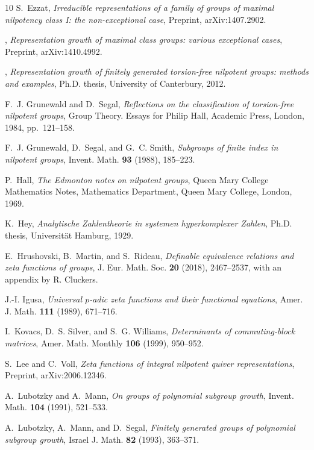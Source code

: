 \documentclass[11pt,a4paper]{amsart}
\theoremstyle{plain}
\theoremstyle{remark}
\begin{document}
\begin{thebibliography}{10}
S.~Ezzat, \emph{{Irreducible representations of a family of groups of maximal
  nilpotency class I: the non-exceptional case}}, Preprint, arXiv:1407.2902.

\bysame, \emph{{Representation growth of maximal class groups: various
  exceptional cases}}, Preprint, arXiv:1410.4992.

\bysame, \emph{{Representation growth of finitely generated torsion-free
  nilpotent groups: methods and examples}}, Ph.D. thesis, University of
  Canterbury, 2012.

F.~J. Grunewald and D.~Segal, \emph{Reflections on the classification of
  torsion-free nilpotent groups}, Group Theory. Essays for Philip Hall,
  Academic Press, London, 1984, pp.~121--158.

F.~J. Grunewald, D.~Segal, and G.~C. Smith, \emph{Subgroups of finite index in
  nilpotent groups}, Invent. Math. \textbf{93} (1988), 185--223.

P.~Hall, \emph{The {E}dmonton notes on nilpotent groups}, Queen Mary College
  Mathematics Notes, Mathematics Department, Queen Mary College, London, 1969.

K.~Hey, \emph{{Analytische Zahlentheorie in systemen hyperkomplexer Zahlen}},
  Ph.D. thesis, Universit\"{a}t Hamburg, 1929.

E.~Hrushovski, B.~Martin, and S.~Rideau, \emph{Definable equivalence relations
  and zeta functions of groups}, J. Eur. Math. Soc. \textbf{20} (2018),
  2467--2537, with an appendix by R. Cluckers.

J.-I. Igusa, \emph{{Universal $p$-adic zeta functions and their functional
  equations}}, Amer. J. Math. \textbf{111} (1989), 671--716.

I.~Kovacs, D.~S. Silver, and S.~G. Williams, \emph{Determinants of
  commuting-block matrices}, Amer. Math. Monthly \textbf{106} (1999), 950--952.

S.~Lee and C.~Voll, \emph{Zeta functions of integral nilpotent quiver
  representations}, Preprint, arXiv:2006.12346.

A.~Lubotzky and A.~Mann, \emph{On groups of polynomial subgroup growth},
  Invent. Math. \textbf{104} (1991), 521--533.

A.~Lubotzky, A.~Mann, and D.~Segal, \emph{Finitely generated groups of
  polynomial subgroup growth}, Israel J. Math. \textbf{82} (1993), 363--371.


\end{thebibliography}
\end{document}
